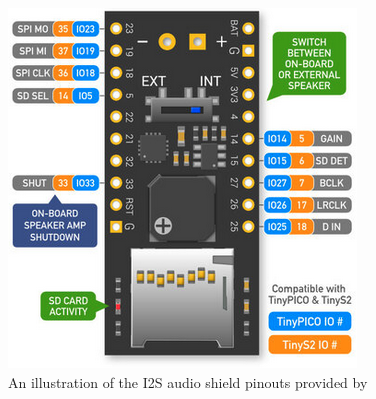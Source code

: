 \begin{figure}[H]
	\centering
	\captionsetup{width=1.0\linewidth}


	\includegraphics[width=0.75\linewidth]{graphics/audioshield_pinouts.png}

	\caption[I2S Audio Shield Pinouts]{An illustration of the I2S audio shield pinouts provided by \cite{unexpected_maker}}

	\label{fig:audioshield_pinouts}

\end{figure}